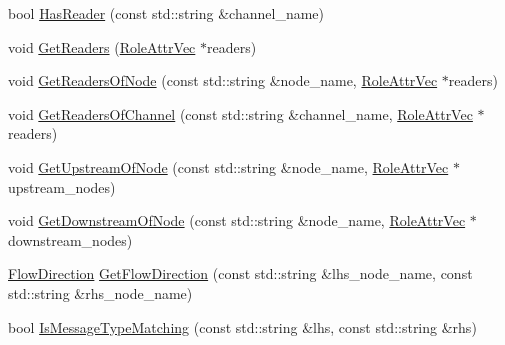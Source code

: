 \begin{DoxyCompactItemize}
\item 
bool \hyperlink{classapollo_1_1cyber_1_1service__discovery_1_1ChannelManager_aa7e63842773a5f7d2b92bd856dc553dd}{Has\-Reader} (const std\-::string \&channel\-\_\-name)
\item 
void \hyperlink{classapollo_1_1cyber_1_1service__discovery_1_1ChannelManager_ae33f40f1a1e771b70e114b661bdeccd7}{Get\-Readers} (\hyperlink{classapollo_1_1cyber_1_1service__discovery_1_1ChannelManager_a3690fc3677abdb994d1de9b996f66cf6}{Role\-Attr\-Vec} $\ast$readers)
\item 
void \hyperlink{classapollo_1_1cyber_1_1service__discovery_1_1ChannelManager_a24c51f2ba8f6cf15fb7c3f44baf496d1}{Get\-Readers\-Of\-Node} (const std\-::string \&node\-\_\-name, \hyperlink{classapollo_1_1cyber_1_1service__discovery_1_1ChannelManager_a3690fc3677abdb994d1de9b996f66cf6}{Role\-Attr\-Vec} $\ast$readers)
\item 
void \hyperlink{classapollo_1_1cyber_1_1service__discovery_1_1ChannelManager_ad20c8af51bdacf9f1a6ecf7ce7bb371d}{Get\-Readers\-Of\-Channel} (const std\-::string \&channel\-\_\-name, \hyperlink{classapollo_1_1cyber_1_1service__discovery_1_1ChannelManager_a3690fc3677abdb994d1de9b996f66cf6}{Role\-Attr\-Vec} $\ast$readers)
\item 
void \hyperlink{classapollo_1_1cyber_1_1service__discovery_1_1ChannelManager_a4d77d8400933c94b6338c9fea4b91d8b}{Get\-Upstream\-Of\-Node} (const std\-::string \&node\-\_\-name, \hyperlink{classapollo_1_1cyber_1_1service__discovery_1_1ChannelManager_a3690fc3677abdb994d1de9b996f66cf6}{Role\-Attr\-Vec} $\ast$upstream\-\_\-nodes)
\item 
void \hyperlink{classapollo_1_1cyber_1_1service__discovery_1_1ChannelManager_aff6f6c68372acdf0768804bba4a45898}{Get\-Downstream\-Of\-Node} (const std\-::string \&node\-\_\-name, \hyperlink{classapollo_1_1cyber_1_1service__discovery_1_1ChannelManager_a3690fc3677abdb994d1de9b996f66cf6}{Role\-Attr\-Vec} $\ast$downstream\-\_\-nodes)
\item 
\hyperlink{namespaceapollo_1_1cyber_1_1service__discovery_a463f9fa98e31287620adc568e1299c79}{Flow\-Direction} \hyperlink{classapollo_1_1cyber_1_1service__discovery_1_1ChannelManager_aefde1d2e4d5134dbf726fe1ad362246a}{Get\-Flow\-Direction} (const std\-::string \&lhs\-\_\-node\-\_\-name, const std\-::string \&rhs\-\_\-node\-\_\-name)
\item 
bool \hyperlink{classapollo_1_1cyber_1_1service__discovery_1_1ChannelManager_ad7a6a93c25b30eca132bd945f1771a59}{Is\-Message\-Type\-Matching} (const std\-::string \&lhs, const std\-::string \&rhs)
\end{DoxyCompactItemize}
